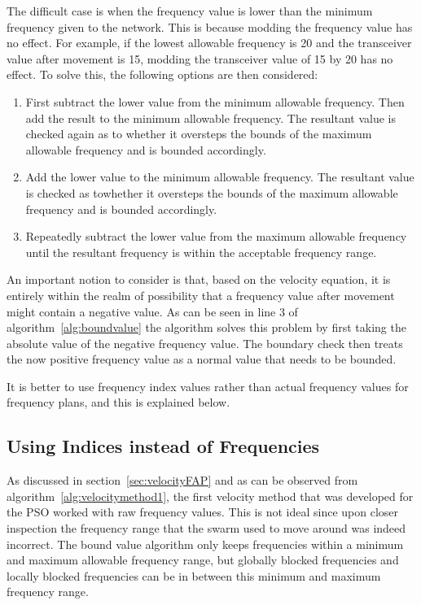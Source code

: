 The difficult case is when the frequency value is lower than the minimum frequency given to the network. This is because modding the frequency value has no effect. For example, if the lowest allowable frequency is 20 and the transceiver value after movement is 15, modding the transceiver value of 15 by 20 has no effect. To solve this, the following options are then considered:

\begin{enumerate}
\item First subtract the lower value from the minimum allowable frequency. Then add the result to the minimum allowable frequency. The resultant value is checked again as to whether it oversteps the bounds of the maximum allowable frequency and is bounded accordingly.
\item Add the lower value to the minimum allowable frequency. The resultant value is checked as towhether it oversteps the bounds of the maximum allowable frequency and is bounded accordingly.
\item Repeatedly subtract the lower value from the maximum allowable frequency until the resultant frequency is within the acceptable frequency range.
\end{enumerate}

An important notion to consider is that, based on the velocity equation, it is entirely within the realm of possibility that a frequency value after movement might contain a negative value. As can be seen in line 3 of algorithm~\ref{alg:boundvalue} the algorithm solves this problem by first taking the absolute value of the negative frequency value. The boundary check then treats the now positive frequency value as a normal value that needs to be bounded.

It is better to use frequency index values rather than actual frequency values for frequency plans, and this is explained below.
\subsection{Using Indices instead of Frequencies}
\label{sec:velocityFAP2}
As discussed in section~\ref{sec:velocityFAP} and as can be observed from algorithm~\ref{alg:velocitymethod1}, the first velocity method that was developed for the PSO worked with raw frequency values. This is not ideal since upon closer inspection the frequency range that the swarm used to move around was indeed incorrect. The bound value algorithm only keeps frequencies within a minimum and maximum allowable frequency range, but globally blocked frequencies and locally blocked frequencies can be in between this minimum and maximum frequency range. 

